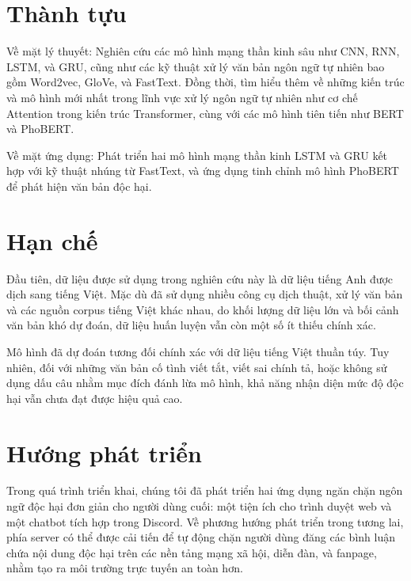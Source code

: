 \section*{Thành tựu}
Về mặt lý thuyết: Nghiên cứu các mô hình mạng thần kinh sâu như CNN, RNN, LSTM, và GRU, cũng như các kỹ thuật xử lý văn bản ngôn ngữ tự nhiên bao gồm Word2vec, GloVe, và FastText. Đồng thời, tìm hiểu thêm về những kiến trúc và mô hình mới nhất trong lĩnh vực xử lý ngôn ngữ tự nhiên như cơ chế Attention trong kiến trúc Transformer, cùng với các mô hình tiên tiến như BERT và PhoBERT.

Về mặt ứng dụng: Phát triển hai mô hình mạng thần kinh LSTM và GRU kết hợp với kỹ thuật nhúng từ FastText, và ứng dụng tinh chỉnh mô hình PhoBERT để phát hiện văn bản độc hại.

\section*{Hạn chế}
Đầu tiên, dữ liệu được sử dụng trong nghiên cứu này là dữ liệu tiếng Anh được dịch sang tiếng Việt. Mặc dù đã sử dụng nhiều công cụ dịch thuật, xử lý văn bản và các nguồn corpus tiếng Việt khác nhau, do khối lượng dữ liệu lớn và bối cảnh văn bản khó dự đoán, dữ liệu huấn luyện vẫn còn một số ít thiếu chính xác.

Mô hình đã dự đoán tương đối chính xác với dữ liệu tiếng Việt thuần túy. Tuy nhiên, đối với những văn bản cố tình viết tắt, viết sai chính tả, hoặc không sử dụng dấu câu nhằm mục đích đánh lừa mô hình, khả năng nhận diện mức độ độc hại vẫn chưa đạt được hiệu quả cao.

\section*{Hướng phát triển}
Trong quá trình triển khai, chúng tôi đã phát triển hai ứng dụng ngăn chặn ngôn ngữ độc hại đơn giản cho người dùng cuối: một tiện ích cho trình duyệt web và một chatbot tích hợp trong Discord. Về phương hướng phát triển trong tương lai, phía server có thể được cải tiến để tự động chặn người dùng đăng các bình luận chứa nội dung độc hại trên các nền tảng mạng xã hội, diễn đàn, và fanpage, nhằm tạo ra môi trường trực tuyến an toàn hơn.